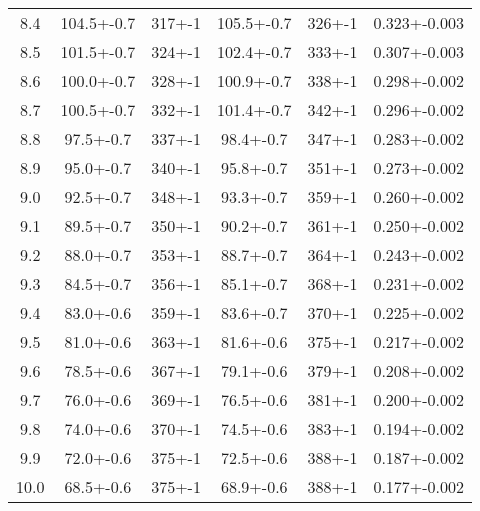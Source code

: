 \begin{table}
{\begin{tabular}{S[table-format=1.1] S S[table-format=1.0(1)] S S S[table-format=1.3(1)]}
        8.4 & 104.5+-0.7 & 317+-1 & 105.5+-0.7 & 326+-1 & 0.323+-0.003 \\
        8.5 & 101.5+-0.7 & 324+-1 & 102.4+-0.7 & 333+-1 & 0.307+-0.003 \\
        8.6 & 100.0+-0.7 & 328+-1 & 100.9+-0.7 & 338+-1 & 0.298+-0.002 \\
        8.7 & 100.5+-0.7 & 332+-1 & 101.4+-0.7 & 342+-1 & 0.296+-0.002 \\
        8.8 & 97.5+-0.7 & 337+-1 & 98.4+-0.7 & 347+-1 & 0.283+-0.002 \\
        8.9 & 95.0+-0.7 & 340+-1 & 95.8+-0.7 & 351+-1 & 0.273+-0.002 \\
        9.0 & 92.5+-0.7 & 348+-1 & 93.3+-0.7 & 359+-1 & 0.260+-0.002 \\
        9.1 & 89.5+-0.7 & 350+-1 & 90.2+-0.7 & 361+-1 & 0.250+-0.002 \\
        9.2 & 88.0+-0.7 & 353+-1 & 88.7+-0.7 & 364+-1 & 0.243+-0.002 \\
        9.3 & 84.5+-0.7 & 356+-1 & 85.1+-0.7 & 368+-1 & 0.231+-0.002 \\
        9.4 & 83.0+-0.6 & 359+-1 & 83.6+-0.7 & 370+-1 & 0.225+-0.002 \\
        9.5 & 81.0+-0.6 & 363+-1 & 81.6+-0.6 & 375+-1 & 0.217+-0.002 \\
        9.6 & 78.5+-0.6 & 367+-1 & 79.1+-0.6 & 379+-1 & 0.208+-0.002 \\
        9.7 & 76.0+-0.6 & 369+-1 & 76.5+-0.6 & 381+-1 & 0.200+-0.002 \\
        9.8 & 74.0+-0.6 & 370+-1 & 74.5+-0.6 & 383+-1 & 0.194+-0.002 \\
        9.9 & 72.0+-0.6 & 375+-1 & 72.5+-0.6 & 388+-1 & 0.187+-0.002 \\
        10.0 & 68.5+-0.6 & 375+-1 & 68.9+-0.6 & 388+-1 & 0.177+-0.002 \\
        \bottomrule
    \end{tabular}
    }
    \label{tab:transmission}
\end{table}